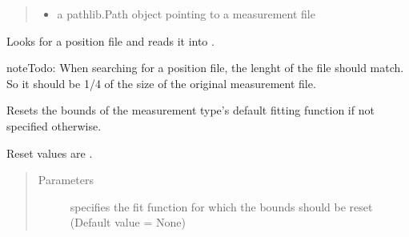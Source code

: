 \documentclass[letterpaper,10pt,english]{sphinxmanual}
\begin{document}
\begin{fulllineitems}
\begin{fulllineitems}
\begin{quote}
\begin{description}
\begin{itemize}
\item {} 
 \textendash{} a pathlib.Path object pointing to a measurement file

\end{itemize}

\end{description}\end{quote}

\end{fulllineitems}


\begin{fulllineitems}
\label{\detokenize{measurement:measurement.Measurement.read_pos_file}}
Looks for a position file and reads it into .

\begin{sphinxadmonition}{note}{\label{measurement:index-6}Todo:}
When searching for a position file, the lenght of the file should match. So it should be 1/4 of the size of the original measurement file.
\end{sphinxadmonition}

\end{fulllineitems}


\begin{fulllineitems}
\label{\detokenize{measurement:measurement.Measurement.reset_bounds}}
Resets the bounds of the measurement type’s default fitting
function if not specified otherwise.

Reset values are .
\begin{quote}\begin{description}
\item[{Parameters}] \leavevmode
{} \textendash{} specifies the fit function for which the
bounds should be reset (Default value = None)

\end{description}\end{quote}


\end{fulllineitems}
\end{fulllineitems}
\end{document}
